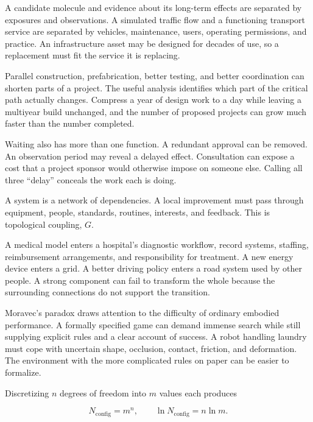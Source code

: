 A candidate molecule and evidence about its long-term effects are separated by exposures and observations. A simulated traffic flow and a functioning transport service are separated by vehicles, maintenance, users, operating permissions, and practice. An infrastructure asset may be designed for decades of use, so a replacement must fit the service it is replacing.\cite{miatto2017how}

Parallel construction, prefabrication, better testing, and better coordination can shorten parts of a project. The useful analysis identifies which part of the critical path actually changes. Compress a year of design work to a day while leaving a multiyear build unchanged, and the number of proposed projects can grow much faster than the number completed.

Waiting also has more than one function. A redundant approval can be removed. An observation period may reveal a delayed effect. Consultation can expose a cost that a project sponsor would otherwise impose on someone else. Calling all three “delay” conceals the work each is doing.


A system is a network of dependencies. A local improvement must pass through equipment, people, standards, routines, interests, and feedback. This is topological coupling, $G$.

A medical model enters a hospital's diagnostic workflow, record systems, staffing, reimbursement arrangements, and responsibility for treatment. A new energy device enters a grid. A better driving policy enters a road system used by other people. A strong component can fail to transform the whole because the surrounding connections do not support the transition.

Moravec's paradox draws attention to the difficulty of ordinary embodied performance. A formally specified game can demand immense search while still supplying explicit rules and a clear account of success. A robot handling laundry must cope with uncertain shape, occlusion, contact, friction, and deformation. The environment with the more complicated rules on paper can be easier to formalize.

Discretizing $n$ degrees of freedom into $m$ values each produces

\begin{equation}
N_{\mathrm{config}}=m^n,
\qquad
\ln N_{\mathrm{config}}=n\ln m.
\end{equation}

